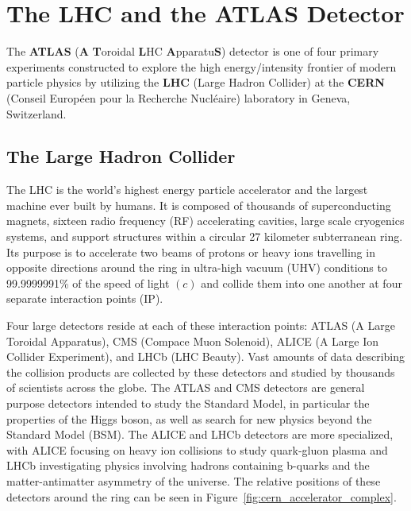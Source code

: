 \graphicspath{{Ch2_Experiment/figures/}}

\chapter{The LHC and the ATLAS Detector}

The \textbf{ATLAS} (\textbf{A} \textbf{T}oroidal \textbf{L}HC \textbf{A}pparatu\textbf{S}) detector is one of four primary experiments constructed to explore the high energy/intensity frontier of modern particle physics by utilizing the \textbf{LHC} (Large Hadron Collider) at the \textbf{CERN} (Conseil Européen pour la Recherche Nucléaire) laboratory in Geneva, Switzerland.


\section{The Large Hadron Collider}
The LHC is the world's highest energy particle accelerator and the largest machine ever built by humans.
It is composed of thousands of superconducting magnets, sixteen radio frequency (RF) accelerating cavities, large scale cryogenics systems, and support structures within a circular 27 kilometer subterranean ring.
Its purpose is to accelerate two beams of protons or heavy ions travelling in opposite directions around the ring in ultra-high vacuum (UHV) conditions to 99.9999991\% of the speed of light $(c)$ and collide them into one another at four separate interaction points (IP).

Four large detectors reside at each of these interaction points: ATLAS (A Large Toroidal Apparatus), CMS (Compace Muon Solenoid), ALICE (A Large Ion Collider Experiment), and LHCb (LHC Beauty).
Vast amounts of data describing the collision products are collected by these detectors and studied by thousands of scientists across the globe.
The ATLAS and CMS detectors are general purpose detectors intended to study the Standard Model, in particular the properties of the Higgs boson, as well as search for new physics beyond the Standard Model (BSM).
The ALICE and LHCb detectors are more specialized, with ALICE focusing on heavy ion collisions to study quark-gluon plasma and LHCb investigating physics involving hadrons containing b-quarks and the matter-antimatter asymmetry of the universe.
The relative positions of these detectors around the ring can be seen in Figure~\ref{fig:cern_accelerator_complex}.

